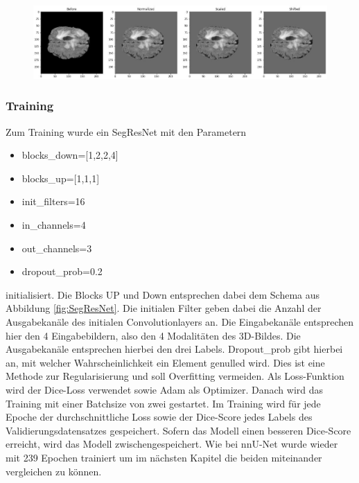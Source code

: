 \begin{figure}[H]
\includegraphics[width=\linewidth]{./images/intensityTransforms.jpg}
\label{fig:intensity}
\end{figure}


\subsubsection{Training}
Zum Training wurde ein SegResNet mit den Parametern
\begin{itemize}
\item blocks\_down=[1,2,2,4]
\item blocks\_up=[1,1,1]
\item init\_filters=16
\item in\_channels=4
\item out\_channels=3
\item dropout\_prob=0.2
\end{itemize}
initialisiert. Die Blocks UP und Down entsprechen dabei dem Schema aus Abbildung \ref{fig:SegResNet}. Die initialen Filter geben dabei die Anzahl der Ausgabekanäle des initialen Convolutionlayers an. Die Eingabekanäle entsprechen hier den 4 Eingabebildern, also den 4 Modalitäten des 3D-Bildes. Die Ausgabekanäle entsprechen hierbei den drei Labels. Dropout\_prob gibt hierbei an, mit welcher Wahrscheinlichkeit ein Element genulled wird. Dies ist eine Methode zur Regularisierung und soll Overfitting vermeiden. Als Loss-Funktion wird der Dice-Loss verwendet sowie Adam als Optimizer. Danach wird das Training mit einer Batchsize von zwei gestartet. Im Training wird für jede Epoche der durchschnittliche Loss sowie der Dice-Score jedes Labels des Validierungsdatensatzes gespeichert. Sofern das Modell einen besseren Dice-Score erreicht, wird das Modell zwischengespeichert. Wie bei nnU-Net wurde wieder mit 239 Epochen trainiert um im nächsten Kapitel die beiden miteinander vergleichen zu können.
